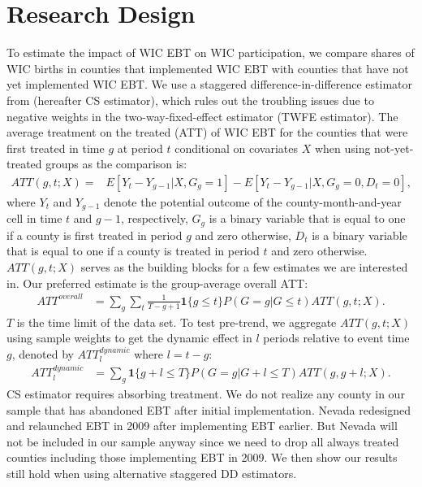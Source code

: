 \section{Research Design}
To estimate the impact of WIC EBT on WIC participation, we compare shares of WIC births in counties that implemented WIC EBT with counties that have not yet implemented WIC EBT. We use a staggered difference-in-difference estimator from \cite{callaway2021difference} (hereafter CS estimator), which rules out the troubling issues due to negative weights in the two-way-fixed-effect estimator (TWFE estimator). The average treatment on the treated (ATT) of WIC EBT for the counties that were first treated in time $g$ at period $t$ conditional on covariates $X$ when using not-yet-treated groups as the comparison is:
\begin{align*}
	ATT (g, t; X) = & E[ Y_t - Y_{g-1} | X, G_g = 1 ] - E[Y_t - Y_{g-1} | X, G_g =0, D_t = 0],
\end{align*}
where $Y_t$ and $Y_{g-1}$ denote the potential outcome of the county-month-and-year cell in time $t$ and $g-1$, respectively, $G_g$ is a binary variable that is equal to one if a county is first treated in period $g$ and zero otherwise, $D_t$ is a binary variable that is equal to one if a county is treated in period $t$ and zero otherwise. $ATT(g, t; X)$ serves as the building blocks for a few estimates we are interested in. Our preferred estimate is the group-average overall ATT:
\begin{align*}
	ATT^{overall} & =\sum_g \sum_t  \frac{1}{T-g+1} \boldsymbol{1} \{ g \leq t \} P(G=g|G \leq t) ATT(g, t; X).
\end{align*}
$T$ is the time limit of the data set. To test pre-trend, we aggregate $ATT(g, t; X)$ using sample weights to get the dynamic effect in $l$ periods relative to event time $g$, denoted by $ATT^{dynamic}_{l}$ where $l = t - g$:
\begin{align*}
	ATT^{dynamic}_{l} & =  \sum_g  \boldsymbol{1}\{g + l \leq T\} P(G = g | G + l \leq T)ATT(g, g +l; X).
\end{align*}
CS estimator requires absorbing treatment. We do not realize any county in our sample that has abandoned EBT after initial implementation. Nevada redesigned and relaunched EBT in 2009 after implementing EBT earlier. But Nevada will not be included in our sample anyway since we need to drop all always treated counties including those implementing EBT in 2009. We then show our results still hold when using alternative staggered DD estimators.

